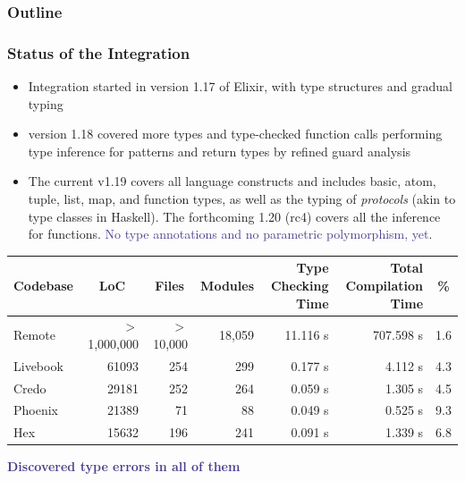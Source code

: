 
\begin{frame}
\frametitle{Outline} 
\tableofcontents[currentsection]
\end{frame}

\begin{frame}
\frametitle{Status of the Integration}\vspace{-4mm}
\begin{itemize}\setlength{\itemsep}{1pt}
\item Integration started in version 1.17 of Elixir, with type structures and gradual typing
\item version 1.18 covered more types and type-checked function calls performing type
inference for patterns and return types by refined guard analysis  
\item The current v1.19 
covers all language constructs and includes basic, atom, tuple, list, map, and
function types, as well as the typing of \textit{protocols} (akin to type classes in Haskell). The forthcoming 1.20 (rc4) covers all the inference for functions. \textcolor{darkslateblue}{No type annotations and no parametric polymorphism, yet}.
\end{itemize}
\pause\smallskip

\small
\begin{tabular}{|l|r|r|r|r|r|r|}
\hline\rowcolor{violet2}
Codebase & \multicolumn{1}{c|}{LoC} & \multicolumn{1}{c|}{Files} & Modules & \makecell{Type Checking\\ Time} & \makecell{Total Compilation\\ Time} & \multicolumn{1}{c|}{\%}\\[-1pt]
\hline
Remote & $>$1,000,000 & $>$10,000 & 18,059 & 11.116 s & 707.598 s  & 1.6\\[-1.5pt]
\rowcolor{violet1}
Livebook & 61093 & 254 & 299 & 0.177 s & 4.112 s&4.3\\[-1.5pt]
Credo & 29181 & 252 & 264 & 0.059 s & 1.305 s &4.5\\[-1.5pt]
\rowcolor{violet1}
Phoenix &  21389& 71& 88 &  0.049 s& 0.525 s&9.3\\[-1.5pt]
Hex & 15632 & 196 & 241 & 0.091 s & 1.339 s  &6.8\\[-1pt]

\hline
\end{tabular}\pause

\bigskip
\textbf{\textcolor{darkslateblue}{\large Discovered type errors in all of them}}   
\end{frame}



